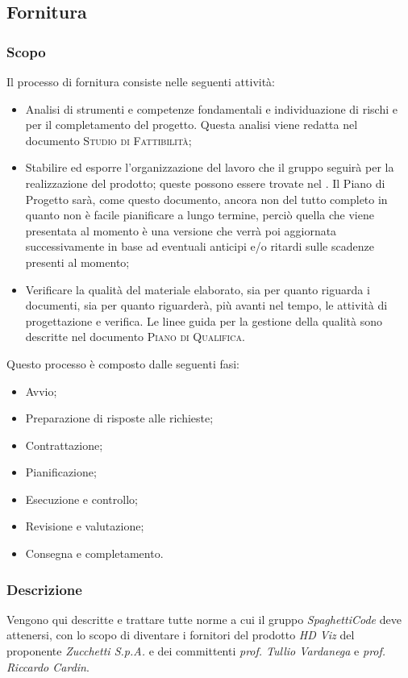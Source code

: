 \documentclass[../norme_di_progetto.tex]{subfiles}
\begin{document}
    
\subsection{Fornitura}
\subsubsection{Scopo}
Il processo di fornitura consiste nelle seguenti attività:
\begin{itemize}
    \item Analisi di strumenti e competenze fondamentali e individuazione di rischi e  per il completamento del progetto. Questa analisi viene redatta nel documento \textsc{Studio di Fattibilità};
    \item Stabilire ed esporre l'organizzazione del lavoro che il gruppo seguirà per la realizzazione del prodotto; queste possono essere trovate nel \textsc{}. Il Piano di Progetto sarà, come questo documento, ancora non del tutto completo in quanto non è facile pianificare a lungo termine, perciò quella che viene presentata al momento è una versione che verrà poi aggiornata successivamente in base ad eventuali anticipi e/o ritardi sulle scadenze presenti al momento;
    \item Verificare la qualità del materiale elaborato, sia per quanto riguarda i documenti, sia per quanto riguarderà, più avanti nel tempo, le attività di progettazione e verifica. Le linee guida per la gestione della qualità sono descritte nel documento \textsc{Piano di Qualifica}.
\end{itemize}

\setlength{\parindent}{0pt}Questo processo è composto dalle seguenti fasi:
\begin{itemize}
    \item Avvio;
    \item Preparazione di risposte alle richieste;
    \item Contrattazione;
    \item Pianificazione;
    \item Esecuzione e controllo;
    \item Revisione e valutazione;
    \item Consegna e completamento.
\end{itemize}

\subsubsection{Descrizione}
Vengono qui descritte e trattare tutte norme a cui il gruppo \emph{SpaghettiCode} deve attenersi, con lo scopo di diventare i fornitori del prodotto \emph{HD Viz} del proponente \emph{Zucchetti S.p.A.} e dei committenti \emph{prof. Tullio Vardanega} e \emph{prof. Riccardo Cardin}.
\end{document}
